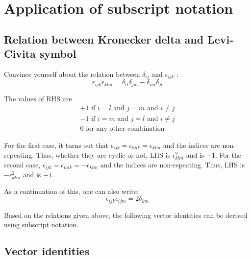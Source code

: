 \chapter{Application of subscript notation}
\label{ch:subnot2}

\section{Relation between Kronecker delta and Levi-Civita symbol}

\begin{question}
\label{epsilon-reduce}
Convince yourself about the relation between $\delta_{ij}$ and $\epsilon_{ijk}$ :
$$\epsilon_{ijk}\epsilon_{klm} = \delta_{il}\delta_{jm} - \delta_{im}\delta_{jl} $$
\end{question}
\begin{solution}[print]
The values of RHS are 
\begin{equation}
\label{epsilondelta}
\begin{array}{r}
+1 \text{ if } i=l \text{ and } j = m \text{ and } i \ne j \\
-1 \text{ if } i=m \text{ and } j = l \text{ and } i \ne j \\
0 \text{ for any other combination}
\end{array}
\end{equation}

For the first case, it turns out that $\epsilon_{ijk} = \epsilon_{lmk} = \epsilon_{klm}$ and the indices are non-repeating. Thus, whether they are cyclic or not, LHS is $\epsilon_{klm}^2$ and is $+1$. For the second case, $\epsilon_{ijk} = \epsilon_{mlk} = -\epsilon_{klm}$ and the indices are non-repeating. Thus, LHS is $-\epsilon_{klm}^2$ and is $-1$. 

\end{solution}

As a continuation of this, one can also write:
$$ \epsilon_{ijk} \epsilon_{ijm} = 2 \delta_{km} $$


Based on the relations given above, the following vector identities can be derived using subscript notation.


\section{Vector identities}

